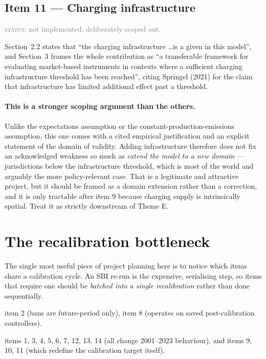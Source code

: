 \documentclass[11pt]{article}
\newcommand{\status}[1]{\textcolor{gray}{\textsc{status:} #1}}
\begin{document}
\subsection{Item 11 --- Charging infrastructure}

\status{not implemented; deliberately scoped out.}

Section~2.2 states that ``the charging infrastructure \dots is a given in
this model'', and Section~3 frames the whole contribution as ``a
transferable framework for evaluating market-based instruments in contexts
where a sufficient charging infrastructure threshold has been reached'',
citing Springel (2021) for the claim that infrastructure has limited
additional effect past a threshold.

\paragraph{This is a stronger scoping argument than the others.} Unlike the
expectations assumption or the constant-production-emissions assumption,
this one comes with a cited empirical justification and an explicit
statement of the domain of validity. Adding infrastructure therefore does
not fix an acknowledged weakness so much as \emph{extend the model to a new
domain} --- jurisdictions below the infrastructure threshold, which is most
of the world and arguably the more policy-relevant case. That is a
legitimate and attractive project, but it should be framed as a domain
extension rather than a correction, and it is only tractable after item 9
because charging supply is intrinsically spatial. Treat it as strictly
downstream of Theme E.

\section{The recalibration bottleneck}
\label{sec:bottleneck}

The single most useful piece of project planning here is to notice which
items share a calibration cycle. An SBI re-run is the expensive, serialising
step, so items that require one should be \emph{batched into a single
recalibration} rather than done sequentially.

\begin{description}[leftmargin=1.5em]
\item[No recalibration:] item 2 (bans are future-period only), item 8
  (operates on saved post-calibration controllers).
\item[Recalibration required:] items 1, 3, 4, 5, 6, 7, 12, 13, 14 (all
  change 2001--2023 behaviour), and items 9, 10, 11 (which redefine the
  calibration target itself).
\end{description}
\end{document}
